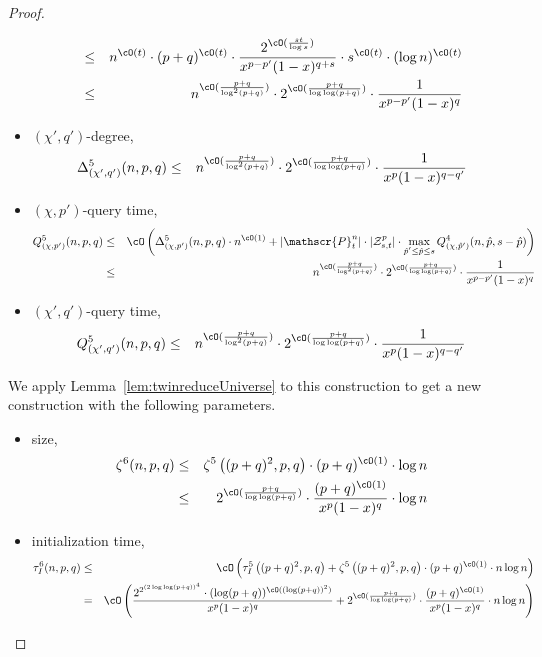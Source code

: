 \begin{proof}
\begin{itemize}
\begin{eqnarray*}
&\leq& n^{\cO(t)}\cdot (p+q)^{\cO(t)} \cdot \frac{2^{\cO(\frac{st}{\log s})}}{x^{p-p'}(1-x)^{q+s}}\cdot s^{\cO(t)}\cdot (\log n)^{\cO(t)}\\
&\leq& n^{\cO(\frac{p+q}{\log^2(p+q)})} \cdot 2^{\cO(\frac{p+q}{\log\log(p+q)})} \cdot \frac{1}{x^{p-p'}(1-x)^q}
\end{eqnarray*}
\item $(\chi',q')$-degree, 
\begin{eqnarray*}
\Delta_{(\chi',q')}^5(n,p,q) 
&\leq& n^{\cO(\frac{p+q}{\log^2(p+q)})} \cdot 2^{\cO(\frac{p+q}{\log\log(p+q)})} \cdot \frac{1}{x^{p}(1-x)^{q-q'}}
\end{eqnarray*}
\item $(\chi,p')$-query time, 
\begin{eqnarray*}
Q_{(\chi,p')}^5(n,p,q) &\leq& \cO\left(\Delta_{(\chi,p')}^5(n,p,q) \cdot n^{\cO(1)} + |\mathscr{P}_{t}^{n}|\cdot |{\cal Z}_{s,t}^{p}| \cdot   
\max_{\substack{\hat{p}'\leq \hat{p} \leq s}} Q_{(\chi,\hat{p}')}^4(n,\hat{p},s-\hat{p}) \right)\\
&\leq& n^{\cO(\frac{p+q}{\log^2(p+q)})} \cdot 2^{\cO(\frac{p+q}{\log\log(p+q)})} \cdot \frac{1}{x^{p-p'}(1-x)^q}
\end{eqnarray*}
\item $(\chi',q')$-query time,
\begin{eqnarray*}
 Q_{(\chi',q')}^5(n,p,q) 
&\leq& n^{\cO(\frac{p+q}{\log^2(p+q)})} \cdot 2^{\cO(\frac{p+q}{\log\log(p+q)})} \cdot \frac{1}{x^{p}(1-x)^{q-q'}}
\end{eqnarray*}
\end{itemize}
We apply Lemma~\ref{lem:twinreduceUniverse} to this construction to get a new construction with the following parameters.
\begin{itemize} \item size, 
\begin{eqnarray*}
\zeta^6(n,p,q) &\leq& \zeta^5\left((p+q)^2,p,q\right) \cdot  (p+q)^{\cO(1)} \cdot \log n\\
&\leq & 2^{\cO(\frac{p+q}{\log\log(p+q)})}\cdot \frac{(p+q)^{\cO(1)}}{x^p(1-x)^q}\cdot \log n
\end{eqnarray*}
\item initialization time, 
\begin{eqnarray*}
\tau_I^6(n,p,q) &\leq& \cO\left(\tau_I^5\left((p+q)^2,p,q\right) + \zeta^5\left((p+q)^2,p,q\right) \cdot (p+q)^{\cO(1)} \cdot n \log n\right)\\
&=&\cO\left(\frac{2^{2^{(2\log\log(p+q))^4}}\cdot (\log(p+q))^{\cO((\log(p+q))^2)}} {x^p(1-x)^q} + 2^{\cO(\frac{p+q}{\log\log(p+q)})}\cdot \frac{(p+q)^{\cO(1)}}{x^p(1-x)^q}\cdot n\log n \right)

\end{eqnarray*}
\end{itemize}
\end{proof}
